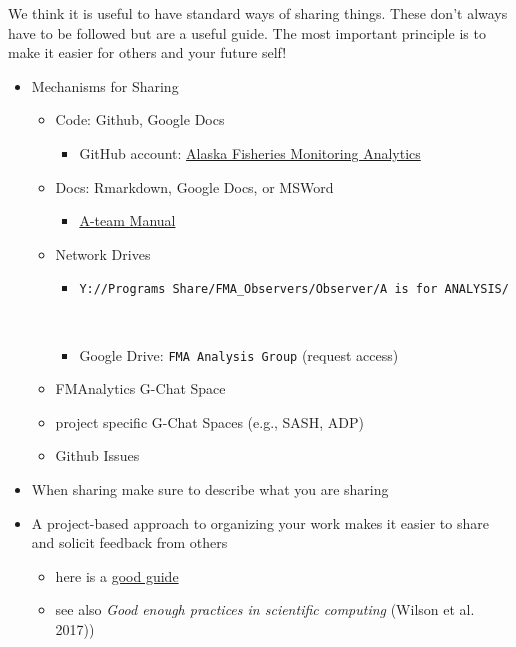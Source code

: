 \documentclass[
  letterpaper,
  DIV=11,
  numbers=noendperiod]{scrreprt}
\providecommand{\tightlist}{%
  \setlength{\itemsep}{0pt}\setlength{\parskip}{0pt}}\usepackage{longtable,booktabs,array}
\begin{document}
We think it is useful to have standard ways of sharing things. These
don't always have to be followed but are a useful guide. The most
important principle is to make it easier for others and your future
self!

\begin{itemize}
\tightlist
\item
  Mechanisms for Sharing

  \begin{itemize}
  \tightlist
  \item
    Code: Github, Google Docs

    \begin{itemize}
    \tightlist
    \item
      GitHub account:
      \href{https://github.com/Alaska-Fisheries-Monitoring-Analytics}{Alaska
      Fisheries Monitoring Analytics}\\
    \end{itemize}
  \item
    Docs: Rmarkdown, Google Docs, or MSWord

    \begin{itemize}
    \tightlist
    \item
      \href{https://github.com/Alaska-Fisheries-Monitoring-Analytics/ateam-manual}{A-team
      Manual}\\
    \end{itemize}
  \item
    Network Drives

    \begin{itemize}
    \tightlist
    \item
      \texttt{Y://Programs\ Share/FMA\_Observers/Observer/A\ is\ for\ ANALYSIS/}\strut \\
    \item
      Google Drive: \texttt{FMA\ Analysis\ Group} (request access) \\
    \end{itemize}
  \item
    FMAnalytics G-Chat Space\\
  \item
    project specific G-Chat Spaces (e.g., SASH, ADP)\\
  \item
    Github Issues\\
  \end{itemize}
\item
  When sharing make sure to describe what you are sharing\\
\item
  A project-based approach to organizing your work makes it easier to
  share and solicit feedback from others

  \begin{itemize}
  \tightlist
  \item
    here is a
    \href{https://www.r-bloggers.com/2018/08/structuring-r-projects/}{good
    guide}\\
  \item
    see also \emph{Good enough practices in scientific computing}
    (Wilson et al. 2017))
  \end{itemize}
\end{itemize}
\end{document}
